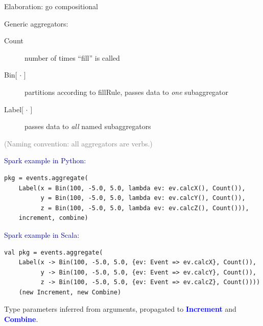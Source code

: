 \documentclass[aspectratio=169]{beamer}
\begin{document}
\begin{frame}{Elaboration: go compositional}
\begin{center}
\begin{minipage}{0.8\linewidth}
\Large
Generic aggregators:
\vspace{0.25 cm}
\begin{description}
\item[Count] number of times ``fill'' is called
\item[Bin$\lbrack\,\cdot\,\rbrack$] partitions according to fillRule, passes data to {\it one} subaggregator
\item[Label$\lbrack\,\cdot\,\rbrack$] passes data to {\it all} named subaggregators
\end{description}

\vspace{0.75 cm}
\textcolor{gray}{\normalsize (Naming convention: all aggregators are verbs.)}
\end{minipage}
\end{center}
\end{frame}

\begin{frame}[fragile]{}
\vspace{1.5 cm}
\textcolor{darkblue}{\Large Spark example in Python:}
\small
\begin{verbatim}
pkg = events.aggregate(
    Label(x = Bin(100, -5.0, 5.0, lambda ev: ev.calcX(), Count()),
          y = Bin(100, -5.0, 5.0, lambda ev: ev.calcY(), Count()),
          z = Bin(100, -5.0, 5.0, lambda ev: ev.calcZ(), Count())),
    increment, combine)
\end{verbatim}

\vspace{0.75 cm}
\textcolor{darkblue}{\Large Spark example in Scala:}
\small
\begin{verbatim}
val pkg = events.aggregate(
    Label(x -> Bin(100, -5.0, 5.0, {ev: Event => ev.calcX}, Count()),
          y -> Bin(100, -5.0, 5.0, {ev: Event => ev.calcY}, Count()),
          z -> Bin(100, -5.0, 5.0, {ev: Event => ev.calcZ}, Count())))
    (new Increment, new Combine)
\end{verbatim}

\normalsize Type parameters inferred from arguments, propagated to \textcolor{blue}{\ttfamily\small \textbf{Increment}} and \textcolor{blue}{\ttfamily\small \textbf{Combine}}.
\end{frame}
\end{document}

